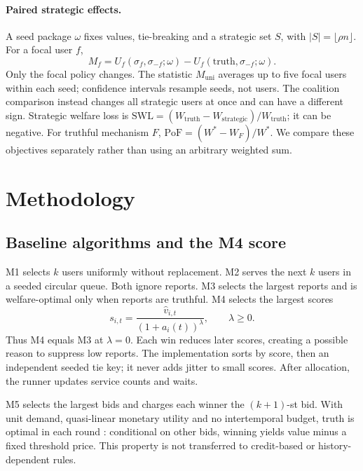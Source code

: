\documentclass{article}
\newcommand{\Muni}{M_{\mathrm{uni}}}
\begin{document}
\paragraph{Paired strategic effects.}
A seed package $\omega$ fixes values, tie-breaking and a strategic set
$S$, with $|S|=\lfloor\rho n\rfloor$. For a focal user $f$,
\[
 M_f=U_f(\sigma_f,\sigma_{-f};\omega)
       -U_f(\mathrm{truth},\sigma_{-f};\omega).
\]
Only the focal policy changes. The statistic $\Muni$ averages up to five
focal users within each seed; confidence intervals resample seeds, not users.
The coalition comparison instead changes all strategic users at once and can
have a different sign. Strategic welfare loss is
$\mathrm{SWL}=(W_{\mathrm{truth}}-W_{\mathrm{strategic}})/W_{\mathrm{truth}}$;
it can be negative.
For truthful mechanism $F$, $\mathrm{PoF}=(W^*-W_F)/W^*$.
We compare these objectives separately rather than using an arbitrary weighted sum.

\section{Methodology}
\subsection{Baseline algorithms and the M4 score}
M1 selects $k$ users uniformly without replacement. M2 serves the next $k$
users in a seeded circular queue. Both ignore reports. M3 selects the largest
reports and is welfare-optimal only when reports are truthful. M4 selects
the largest scores
\[
 s_{i,t}=\frac{\hat v_{i,t}}{(1+a_i(t))^\lambda},\qquad \lambda\ge0.
\]
Thus M4 equals M3 at $\lambda=0$. Each win reduces later scores, creating a
possible reason to suppress low reports. The implementation sorts by score,
then an independent seeded tie key; it never adds jitter to small scores.
After allocation, the runner updates service counts and waits.

M5 selects the largest bids and charges each winner the $(k+1)$-st bid.
With unit demand, quasi-linear monetary utility and no intertemporal budget,
truth is optimal in each round \cite{vickrey1961counterspeculation}:
conditional on other bids, winning yields value minus a fixed threshold price.
This property is not transferred to credit-based or history-dependent rules.
\end{document}
